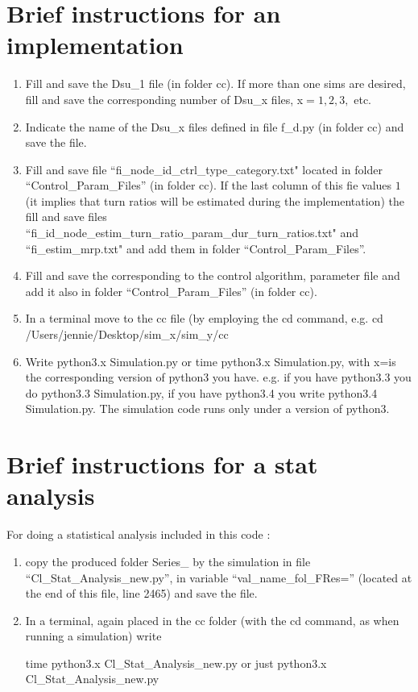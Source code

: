 
\section{Brief instructions for an implementation}

\begin{enumerate}
\item Fill and save the Dsu\_1 file (in folder cc). If more than one sims are desired, fill and save the corresponding number of Dsu\_x files, x$=1,2,3,$ etc.
\item Indicate the name of the Dsu\_x files defined in file f\_d.py (in folder cc) and save the file.
\item Fill and save  file ``fi\_node\_id\_ctrl\_type\_category.txt" located in folder ``Control\_Param\_Files''  (in folder cc).
If the last column of this fie values $1$ (it implies that turn ratios will be estimated during the implementation) the fill and save files ``fi\_id\_node\_estim\_turn\_ratio\_param\_dur\_turn\_ratios.txt" and ``fi\_estim\_mrp.txt" and add them in  folder ``Control\_Param\_Files''.
\item Fill  and save the corresponding to the control algorithm, parameter file and add it also in folder ``Control\_Param\_Files'' (in folder cc).
\item 
In a terminal  move to the cc file (by employing the cd command, 
e.g.  cd /Users/jennie/Desktop/sim\_x/sim\_y/cc
\item Write python3.x Simulation.py or time python3.x Simulation.py, with x=is the corresponding version of python3 you have.
e.g. if you have python3.3 you do python3.3 Simulation.py, if you have python3.4 you write python3.4 Simulation.py.
The simulation code runs only under a version of python3.
\end{enumerate}

\section{Brief instructions for a stat analysis}
For doing a statistical analysis included in this code :
\begin{enumerate}

\item copy the produced folder Series\_  by the simulation in file ``Cl\_Stat\_Analysis\_new.py'', in variable  ``val\_name\_fol\_FRes='' (located at the end of this file, line 2465) and save the file.

\item In a terminal, again placed in the cc folder (with the cd command, as when running a simulation) write

time python3.x Cl\_Stat\_Analysis\_new.py or just python3.x Cl\_Stat\_Analysis\_new.py
\end{enumerate}